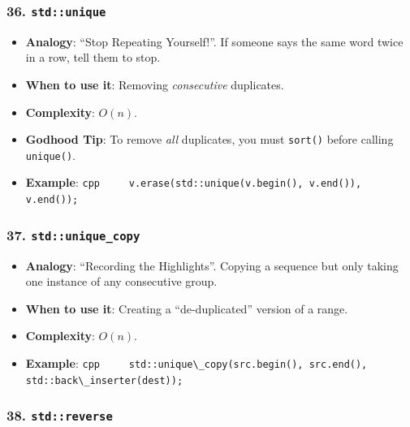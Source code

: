 \hypertarget{stdunique}{%
\subsubsection{\texorpdfstring{36.
\texttt{std::unique}}{36. std::unique}}\label{stdunique}}

\begin{itemize}
\tightlist
\item
  \textbf{Analogy}: ``Stop Repeating Yourself!''. If someone says the
  same word twice in a row, tell them to stop.
\item
  \textbf{When to use it}: Removing \emph{consecutive} duplicates.
\item
  \textbf{Complexity}: \(O(n)\).
\item
  \textbf{Godhood Tip}: To remove \emph{all} duplicates, you must
  \passthrough{\lstinline!sort()!} before calling
  \passthrough{\lstinline!unique()!}.
\item
  \textbf{Example}:
  \passthrough{\lstinline!cpp     v.erase(std::unique(v.begin(), v.end()), v.end());!}
\end{itemize}

\hypertarget{stdunique_copy}{%
\subsubsection{\texorpdfstring{37.
\texttt{std::unique\_copy}}{37. std::unique\_copy}}\label{stdunique_copy}}

\begin{itemize}
\tightlist
\item
  \textbf{Analogy}: ``Recording the Highlights''. Copying a sequence but
  only taking one instance of any consecutive group.
\item
  \textbf{When to use it}: Creating a ``de-duplicated'' version of a
  range.
\item
  \textbf{Complexity}: \(O(n)\).
\item
  \textbf{Example}:
  \passthrough{\lstinline!cpp     std::unique\_copy(src.begin(), src.end(), std::back\_inserter(dest));!}
\end{itemize}

\hypertarget{stdreverse}{%
\subsubsection{\texorpdfstring{38.
\texttt{std::reverse}}{38. std::reverse}}\label{stdreverse}}

